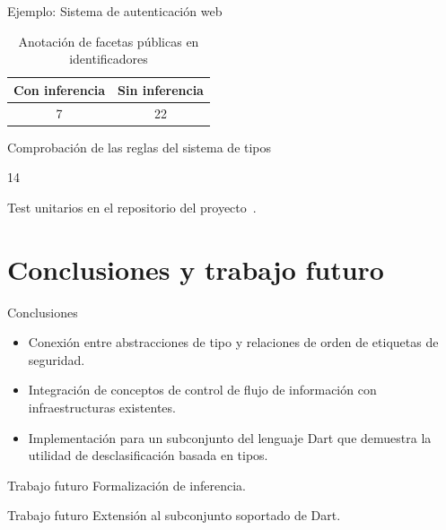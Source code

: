 \documentclass[aspectratio=169,10pt]{beamer}
\begin{document}
\begin{frame}[fragile]{Ejemplo: Sistema de autenticación web}
	\begin{table}
		\caption{Anotación de facetas públicas en identificadores}
		\begin{tabular}{c|c}
      Con inferencia & Sin inferencia\\
      \hline
      7 & 22\\
		\end{tabular}
	\end{table}
\end{frame}

\begin{frame}[fragile]{Comprobación de las reglas del sistema de tipos}
	\begin{center}
		\Huge{\alert{14}} \\
		\vspace{1cm}
	\end{center}
	\begin{center}
		Test unitarios en el repositorio del proyecto~\cite{repo}.
	\end{center}

\end{frame}

\section{Conclusiones y trabajo futuro}

\begin{frame}[fragile]{Conclusiones}
	\begin{itemize}
		\item Conexión entre abstracciones de tipo y relaciones de orden de etiquetas de seguridad. \pause
		\item Integración de conceptos de control de flujo de información con infraestructuras existentes. \pause
		\item Implementación para un subconjunto del lenguaje Dart que demuestra la utilidad de desclasificación basada en tipos.
	\end{itemize}

\end{frame}

\begin{frame}[fragile]{Trabajo futuro}
	Formalización de inferencia.
\end{frame}

\begin{frame}[fragile]{Trabajo futuro}
	Extensión al subconjunto soportado de Dart.
\end{frame}
\end{document}
